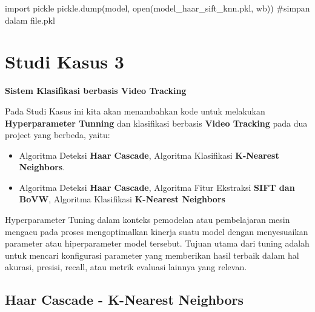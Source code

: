 \documentclass[
  letterpaper,
  DIV=11,
  numbers=noendperiod]{scrreprt}
\newenvironment{Shaded}{\begin{snugshade}}{\end{snugshade}}
\newcommand{\BuiltInTok}[1]{\textcolor[rgb]{0.00,0.23,0.31}{#1}}
\newcommand{\CommentTok}[1]{\textcolor[rgb]{0.37,0.37,0.37}{#1}}
\newcommand{\ImportTok}[1]{\textcolor[rgb]{0.00,0.46,0.62}{#1}}
\newcommand{\NormalTok}[1]{\textcolor[rgb]{0.00,0.23,0.31}{#1}}
\newcommand{\StringTok}[1]{\textcolor[rgb]{0.13,0.47,0.30}{#1}}
\providecommand{\tightlist}{%
  \setlength{\itemsep}{0pt}\setlength{\parskip}{0pt}}\usepackage{longtable,booktabs,array}
\begin{document}
\begin{Shaded}
\begin{Highlighting}[]
\ImportTok{import}\NormalTok{ pickle}
\NormalTok{pickle.dump(model, }\BuiltInTok{open}\NormalTok{(}\StringTok{\textquotesingle{}model\_haar\_sift\_knn.pkl\textquotesingle{}}\NormalTok{, }\StringTok{\textquotesingle{}wb\textquotesingle{}}\NormalTok{)) }\CommentTok{\#simpan dalam file.pkl}
\end{Highlighting}
\end{Shaded}

\hypertarget{studi-kasus-3}{%
\chapter*{Studi Kasus 3}\label{studi-kasus-3}}


\textbf{Sistem Klasifikasi berbasis Video Tracking}

Pada Studi Kasus ini kita akan menambahkan kode untuk melakukan
\textbf{Hyperparameter Tunning} dan klasifikasi berbasis \textbf{Video
Tracking} pada dua project yang berbeda, yaitu:

\begin{itemize}
\tightlist
\item
  Algoritma Deteksi \textbf{Haar Cascade}, Algoritma Klasifikasi
  \textbf{K-Nearest Neighbors}.\\
\item
  Algoritma Deteksi \textbf{Haar Cascade}, Algoritma Fitur Ekstraksi
  \textbf{SIFT dan BoVW}, Algoritma Klasifikasi \textbf{K-Nearest
  Neighbors}
\end{itemize}

Hyperparameter Tuning dalam konteks pemodelan atau pembelajaran mesin
mengacu pada proses mengoptimalkan kinerja suatu model dengan
menyesuaikan parameter atau hiperparameter model tersebut. Tujuan utama
dari tuning adalah untuk mencari konfigurasi parameter yang memberikan
hasil terbaik dalam hal akurasi, presisi, recall, atau metrik evaluasi
lainnya yang relevan.

\hypertarget{haar-cascade---k-nearest-neighbors-1}{%
\section*{Haar Cascade - K-Nearest
Neighbors}\label{haar-cascade---k-nearest-neighbors-1}}
\end{document}
